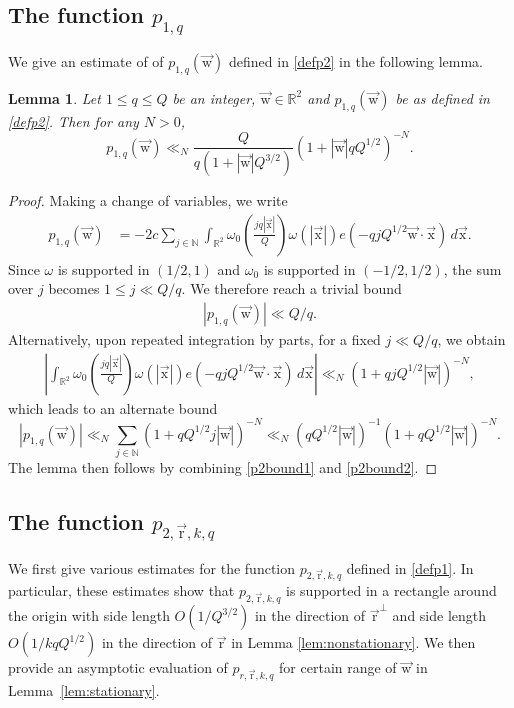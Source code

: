 \documentclass[letterpaper,11pt]{amsart}
\numberwithin{equation}{section}
\newtheorem{lemma}[theorem]{Lemma}
\theoremstyle{definition}
\numberwithin{equation}{section}
\newcommand{\NN}{\mathbb{N}}
\newcommand{\RR}{\mathbb{R}}
\newcommand{\ux}{{\vec{\mathrm{x}}}}
\newcommand{\ur}{\vec{\mathrm{r}}}
\newcommand{\uw}{{\vec{\mathrm{w}}}}
\newcommand{\R}{\mathbb{R}}
\begin{document}
\subsection{The function \(p_{1, q}\)}
We give an estimate of of $p_{1,q}(\uw)$ defined in \eqref{defp2} in the following lemma. 
\begin{lemma}\label{lem:p2bound} Let $1\leq q\leq Q$ be an integer, $\uw\in\RR^2$ and $p_{1,q}(\uw)$ be as defined in \eqref{defp2}. Then for any $N>0 $,
	\[
	p_{1,q}(\uw)
	\ll_N \frac{Q}{q(1+|\uw|Q^{3/2})}(1+|\uw|qQ^{1/2})^{-N}.
	\]
\end{lemma}

\begin{proof}
	Making a change of variables, we write
	\begin{align*}
	p_{1,q}(\uw)
	&=
	-
	2c
	\sum_{j\in\NN}\int_{\R^2} 
	\omega_0\left(\frac{jq|\ux|}{Q}\right)
	\omega
	\left(|\ux|
	\right)
	e(-qjQ^{1/2}\uw\cdot \ux)
	\,d\ux.
	\end{align*}
	Since $\omega$ is supported in $(1/2,1)$ and $\omega_0$ is supported in $(-1/2,1/2)$, the sum over $j$ becomes $1\leq j\ll Q/q$. We therefore reach a trivial bound
	\begin{align}\label{p2bound1}
	|p_{1,q}(\uw)|\ll Q/q.
	\end{align}
	Alternatively, upon repeated integration by parts, for a fixed $j\ll Q/q$, we obtain
	\begin{align*}
	\left|\int_{\R^2} 
	\omega_0\left(\frac{jq|\ux|}{Q}\right)
	\omega
	\left(|\ux|
	\right)
	e(-qjQ^{1/2}\uw\cdot \ux)
	\,d\ux\right|\ll_N (1+qjQ^{1/2}|\uw|)^{-N}, 
	\end{align*}
	which leads to an alternate bound
	\begin{equation}\label{p2bound2}
	|p_{1,q}(\uw)|\ll_N \sum_{j\in \NN} (1+qQ^{1/2}j|\uw|)^{-N}\ll_N (qQ^{1/2}|\uw|)^{-1}(1+qQ^{1/2}|\uw|)^{-N}.
	\end{equation}
	The lemma then follows by combining \eqref{p2bound1} and \eqref{p2bound2}.
\end{proof}
\subsection{The function $p_{2, \ur, k, q}$}
We first give various estimates for the function $p_{2, \ur, k,q}$ defined in \eqref{defp1}. In particular, these estimates show that $p_{2, \ur, k, q}$ is supported in a rectangle around the origin with side length $O(1/Q^{3/2})$ in the direction of $\ur^\perp$ and side length $O(1/kqQ^{1/2})$ in the direction of $\ur$ in Lemma \ref{lem:nonstationary}. We then provide an asymptotic evaluation of $p_{r, \ur, k, q}$ for certain range of $\uw$ in Lemma~\ref{lem:stationary}. 
 
\end{document}
